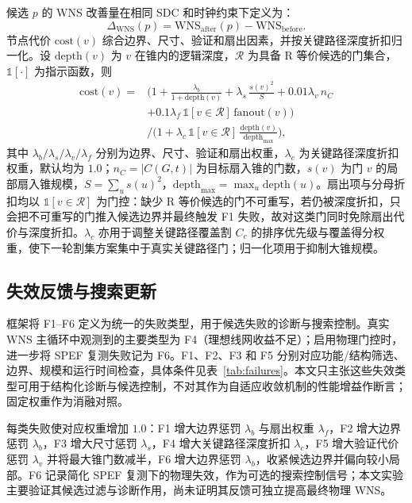 \documentclass[twocolumn,10pt,fontset=windows]{ctexart}
\begin{document}
候选 $p$ 的 WNS 改善量在相同 SDC 和时钟约束下定义为：
\begin{equation}\label{eq:dtiming}
\Delta_{\mathrm{WNS}}(p) = \mathrm{WNS}_{\mathrm{after}}(p) - \mathrm{WNS}_{\mathrm{before}}.
\end{equation}
节点代价 $\mathrm{cost}(v)$ 综合边界、尺寸、验证和扇出因素，并按关键路径深度折扣归一化。设 $\mathrm{depth}(v)$ 为 $v$ 在锥内的逻辑深度，$\mathcal{R}$ 为具备 R 等价候选的门集合，$\mathbb{1}[\cdot]$ 为指示函数，则
{\small
\begin{equation}
\label{eq:cost}
\begin{aligned}
\mathrm{cost}(v) ={}& \Big(1 + \frac{\lambda_b}{1+\mathrm{depth}(v)}
 + \lambda_s\,\frac{s(v)^2}{S}
 + 0.01\lambda_v\,n_C \\
 &+ 0.1\lambda_f\,\mathbb{1}[v{\in}\mathcal{R}]\,\mathrm{fanout}(v)\Big) \\
 &\Big/\Big(1 + \lambda_c\,\mathbb{1}[v{\in}\mathcal{R}]\,
 \frac{\mathrm{depth}(v)}{\mathrm{depth}_{\max}}\Big),
\end{aligned}
\end{equation}
}
其中 $\lambda_b/\lambda_s/\lambda_v/\lambda_f$ 分别为边界、尺寸、验证和扇出权重，$\lambda_c$ 为关键路径深度折扣权重，默认均为 $1.0$；$n_C=|C(G,t)|$ 为目标扇入锥的门数，$s(v)$ 为门 $v$ 的局部扇入锥规模，$S=\sum_u s(u)^2$，$\mathrm{depth}_{\max}=\max_u \mathrm{depth}(u)$。扇出项与分母折扣均以 $\mathbb{1}[v{\in}\mathcal{R}]$ 为门控：缺少 R 等价候选的门不可重写，若仍被深度折扣，只会把不可重写的门推入候选边界并最终触发 F1 失败，故对这类门同时免除扇出代价与深度折扣。$\lambda_c$ 亦用于调整关键路径覆盖割 $C_c$ 的排序优先级与覆盖得分权重，使下一轮割集方案集中于真实关键路径门；归一化项用于抑制大锥规模。

\subsection{失效反馈与搜索更新}

\FloatBarrier
\FloatBarrier
框架将 F1--F6 定义为统一的失败类型，用于候选失败的诊断与搜索控制。真实 WNS 主循环中观测到的主要类型为 F4（理想线网收益不足）；启用物理门控时，进一步将 SPEF 复测失败记为 F6。F1、F2、F3 和 F5 分别对应功能/结构筛选、边界、规模和运行时间检查，具体条件见表~\ref{tab:failures}。本文只主张这些失效类型可用于结构化诊断与候选控制，不对其作为自适应收敛机制的性能增益作断言；固定权重作为消融对照。

每类失败使对应权重增加 $1.0$：F1 增大边界惩罚 $\lambda_b$ 与扇出权重 $\lambda_f$，F2 增大边界惩罚 $\lambda_b$，F3 增大尺寸惩罚 $\lambda_s$，F4 增大关键路径深度折扣 $\lambda_c$，F5 增大验证代价惩罚 $\lambda_v$ 并将最大锥门数减半，F6 增大边界惩罚 $\lambda_b$，收紧候选边界并偏向较小局部。F6 记录简化 SPEF 复测下的物理失效，作为可选的搜索控制信号；本文实验主要验证其候选过滤与诊断作用，尚未证明其反馈可独立提高最终物理 WNS。
\end{document}
